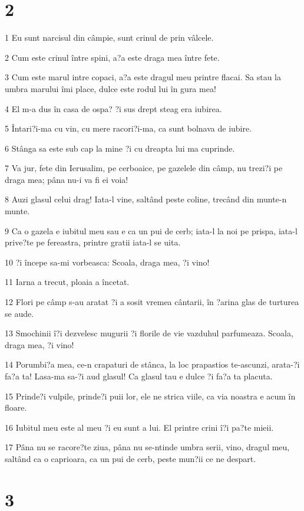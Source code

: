 \chapter{2}

\par 1 Eu sunt narcisul din câmpie, sunt crinul de prin vâlcele.
\par 2 Cum este crinul între spini, a?a este draga mea între fete.
\par 3 Cum este marul intre copaci, a?a este dragul meu printre flacai. Sa stau la umbra marului îmi place, dulce este rodul lui în gura mea!
\par 4 El m-a dus în casa de ospa? ?i sus drept steag era iubirea.
\par 5 Întari?i-ma cu vin, cu mere racori?i-ma, ca sunt bolnava de iubire.
\par 6 Stânga sa este sub cap la mine ?i cu dreapta lui ma cuprinde.
\par 7 Va jur, fete din Ierusalim, pe cerboaice, pe gazelele din câmp, nu trezi?i pe draga mea; pâna nu-i va fi ei voia!
\par 8 Auzi glasul celui drag! Iata-l vine, saltând peste coline, trecând din munte-n munte.
\par 9 Ca o gazela e iubitul meu sau e ca un pui de cerb; iata-l la noi pe prispa, iata-l prive?te pe fereastra, printre gratii iata-l se uita.
\par 10 ?i începe sa-mi vorbeasca: Scoala, draga mea, ?i vino!
\par 11 Iarna a trecut, ploaia a încetat.
\par 12 Flori pe câmp s-au aratat ?i a sosit vremea cântarii, în ?arina glas de turturea se aude.
\par 13 Smochinii î?i dezvelesc mugurii ?i florile de vie vazduhul parfumeaza. Scoala, draga mea, ?i vino!
\par 14 Porumbi?a mea, ce-n crapaturi de stânca, la loc prapastios te-ascunzi, arata-?i fa?a ta! Lasa-ma sa-?i aud glasul! Ca glasul tau e dulce ?i fa?a ta placuta.
\par 15 Prinde?i vulpile, prinde?i puii lor, ele ne strica viile, ca via noastra e acum în floare.
\par 16 Iubitul meu este al meu ?i eu sunt a lui. El printre crini î?i pa?te mieii.
\par 17 Pâna nu se racore?te ziua, pâna nu se-ntinde umbra serii, vino, dragul meu, saltând ca o caprioara, ca un pui de cerb, peste mun?ii ce ne despart.

\chapter{3}

